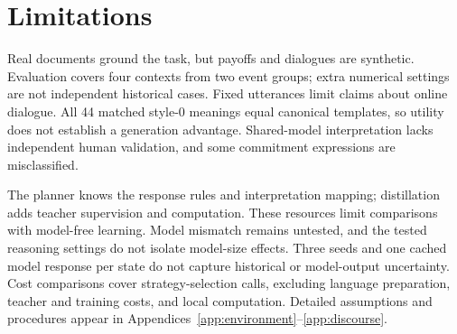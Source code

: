 \section*{Limitations}
Real documents ground the task, but payoffs and dialogues are synthetic. Evaluation covers four contexts from two event groups; extra numerical settings are not independent historical cases. Fixed utterances limit claims about online dialogue. All 44 matched style-0 meanings equal canonical templates, so utility does not establish a generation advantage. Shared-model interpretation lacks independent human validation, and some commitment expressions are misclassified.

The planner knows the response rules and interpretation mapping; distillation adds teacher supervision and computation. These resources limit comparisons with model-free learning. Model mismatch remains untested, and the tested reasoning settings do not isolate model-size effects. Three seeds and one cached model response per state do not capture historical or model-output uncertainty. Cost comparisons cover strategy-selection calls, excluding language preparation, teacher and training costs, and local computation. Detailed assumptions and procedures appear in Appendices~\ref{app:environment}--\ref{app:discourse}.

